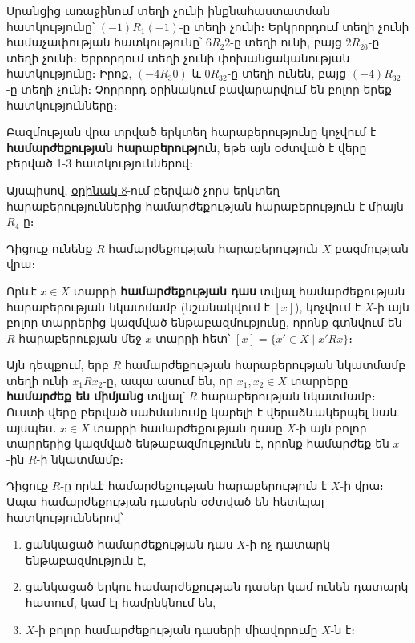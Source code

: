 \documentclass[./main.tex]{subfiles}
\begin{document}
\par Սրանցից առաջինում տեղի չունի ինքնահաստատման հատկությունը՝ $(-1)R_1 (-1)\textrm{-ը}$ տեղի չունի։
Երկրորդում տեղի չունի համաչափության հատկությունը՝ $6R_2 2$-ը տեղի ունի, բայց $2R_26$-ը տեղի չունի։ Երրորդում տեղի չունի փո\-խան\-ցա\-կա\-նու\-թյան հատ\-կութ\-յունը։ Իրոք, $(-4 R_3 0)$ և $0R_32$-ը տեղի ունեն, բայց $(-4)R_32$-ը տեղի չունի։ Չոր\-րորդ օրինակում բավարարվում են բոլոր երեք հատկությունները։
\begin{definition}
 Բազմության վրա տրված երկտեղ հարաբերությունը կոչվում է \textbf{համարժեքության հարաբերություն}, եթե այն օժտված է վերը բերված 1-3 հատ\-կու\-թյուն\-նե\-րով։
\end{definition}
\par Այսպիսով, \hyperref[ch2ex8]{օրինակ 8}-ում բերված չորս երկտեղ հարաբերություններից հա\-մար\-ժե\-քու\-թյան հարաբերություն է միայն $R_4$-ը։
\par Դիցուք ունենք $R$ համարժեքության հարաբերություն $X$ բազմության վրա։
\begin{definition}
 Որևէ $x \in X $ տարրի \textbf{համարժեքության դաս} տվյալ հա\-մար\-ժե\-քու\-թյան հարաբերության նկատմամբ (նշանակվում է $[x]$), կոչվում է $X$-ի այն բոլոր տարրերից կազմված ենթաբազմությունը, որոնք գտնվում են $R$ հարաբերության մեջ $x$ տարրի հետ՝ $[x]=\{x' \in X\mid x'Rx\}$։
\end{definition}
\par Այն դեպքում, երբ $R$ համարժեքության հարաբերության նկատմամբ տեղի ունի $x_1Rx_2$-ը, ապա ասում են, որ $x_1,x_2 \in X$ տարրերը \textbf{համարժեք են միմյանց} տվյալ՝ $R$ հարաբերության նկատմամբ։ Ուստի վերը բերված սահմանումը կարելի է վերա\-ձևա\-կեր\-պել նաև այսպես․ $x\in X $ տարրի համարժեքության դասը $X$-ի այն բոլոր տարրերից կազմված ենթաբազմությունն է, որոնք համարժեք են $x$-ին $R$-ի նկատ\-մամբ։
\begin{theorem}\label{ch2thm5} 
Դիցուք $R$-ը որևէ համարժեքության հարաբերություն է $X$-ի վրա։ Ապա հա\-մար\-ժե\-քու\-թյան դասերն օժտված են հետևյալ հատկություններով՝
\begin{enumerate}
    \item ցանկացած համարժեքության դաս $X$-ի ոչ դատարկ ենթաբազմություն է,
    \item ցանկացած երկու համարժեքության դասեր կամ ունեն դատարկ հատում, \linebreak կամ էլ համընկնում են,
    \item $X$-ի բոլոր համարժեքության դասերի միավորումը $X$-ն է։
\end{enumerate}
\end{theorem}
\end{document}
